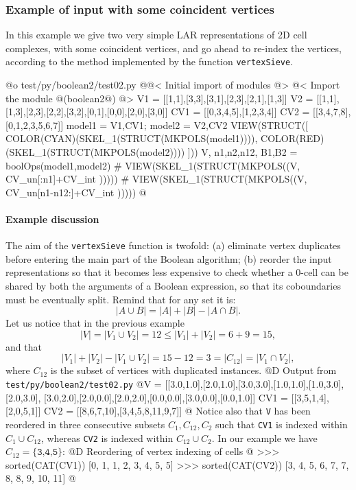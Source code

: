 \documentclass[11pt,oneside]{article}	%
\begin{document}
\subsubsection{Example of input with some coincident vertices}
In this example we give two very simple LAR representations of 2D cell complexes, with some coincident vertices, and go ahead to re-index the vertices, according to the method implemented by the function \texttt{vertexSieve}.

@o test/py/boolean2/test02.py
@{@< Initial import of modules @>
@< Import the module @(boolean2@) @>
V1 = [[1,1],[3,3],[3,1],[2,3],[2,1],[1,3]]
V2 = [[1,1],[1,3],[2,3],[2,2],[3,2],[0,1],[0,0],[2,0],[3,0]]
CV1 = [[0,3,4,5],[1,2,3,4]]
CV2 = [[3,4,7,8],[0,1,2,3,5,6,7]]
model1 = V1,CV1; model2 = V2,CV2
VIEW(STRUCT([ 
	COLOR(CYAN)(SKEL_1(STRUCT(MKPOLS(model1)))), 
	COLOR(RED)(SKEL_1(STRUCT(MKPOLS(model2)))) ]))
V, n1,n2,n12, B1,B2 = boolOps(model1,model2)
# VIEW(SKEL_1(STRUCT(MKPOLS((V, CV_un[:n1]+CV_int )))))
# VIEW(SKEL_1(STRUCT(MKPOLS((V, CV_un[n1-n12:]+CV_int )))))
@}

\paragraph{Example discussion} 
The aim of the \texttt{vertexSieve} function is twofold: (a) eliminate vertex duplicates before entering the main part of the Boolean algorithm; (b) reorder the input representations so that it becomes less expensive to check whether a 0-cell can be shared by both the arguments of a Boolean expression, so that its coboundaries must be eventually split. Remind that for any set it is:
\[
|A\cup B| = |A|+|B|-|A\cap B|.
\]
Let us notice that in the previous example
\[
|V| = |V_1 \cup V_2| = 12 \leq |V_1|+|V_2| = 6+9 = 15,
\]
and that 
\[
|V_1|+|V_2| - |V_1 \cup V_2| = 15 - 12 = 3 = |C_{12}| = |V_1 \cap V_2|,
\]
where $C_{12}$ is the subset of vertices with duplicated instances.
@D Output from \texttt{test/py/boolean2/test02.py}
@{V   = [[3.0,1.0],[2.0,1.0],[3.0,3.0],[1.0,1.0],[1.0,3.0],[2.0,3.0],
		 [3.0,2.0],[2.0,0.0],[2.0,2.0],[0.0,0.0],[3.0,0.0],[0.0,1.0]]
CV1 = [[3,5,1,4],[2,0,5,1]]
CV2 = [[8,6,7,10],[3,4,5,8,11,9,7]]
@}
Notice also that \texttt{V} has been reordered in three consecutive subsets $C_{1},C_{12},C_{2}$ such that \texttt{CV1} is indexed within $C_{1}\cup C_{12}$, whereas \texttt{CV2} is indexed within $C_{12}\cup C_{2}$. In our example we have  $C_{12}=\{\texttt{3,4,5}\}$: 
@D Reordering of vertex indexing of cells
@{
>>> sorted(CAT(CV1))
[0, 1, 1, 2, 3, 4, 5, 5]
>>> sorted(CAT(CV2))
[3, 4, 5, 6, 7, 7, 8, 8, 9, 10, 11]
@}
\end{document}
